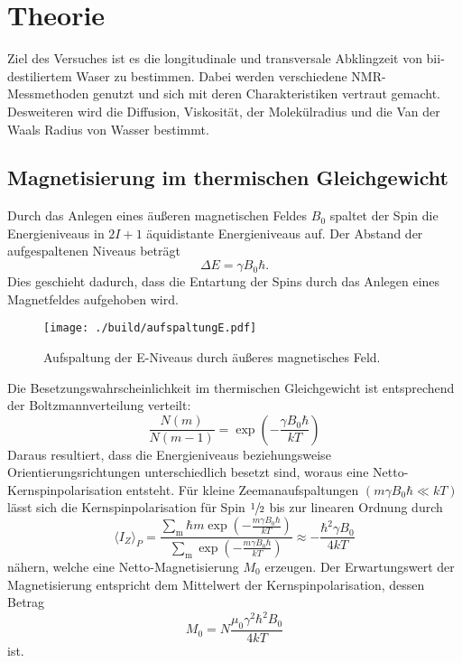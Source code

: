 \section{Theorie}%
\label{sec:theorie}
Ziel des Versuches ist es die longitudinale und transversale Abklingzeit von
bii-destiliertem Waser zu bestimmen.
Dabei werden verschiedene NMR-Messmethoden genutzt und sich mit deren
Charakteristiken vertraut gemacht.
Desweiteren wird die Diffusion, Viskosität, der Molekülradius und die Van der Waals
Radius von Wasser bestimmt.
\subsection{Magnetisierung im thermischen Gleichgewicht}%
\label{ssub:magnetieserung_im_thermischen_gleichgewicht}
Durch das Anlegen eines äußeren magnetischen Feldes $B_0$ spaltet der Spin die Energieniveaus in $2 I
+ 1$ äquidistante Energieniveaus auf.
Der Abstand der aufgespaltenen Niveaus beträgt
\begin{equation}
		\label{eq:delta_e}
		\Delta E = \gamma B_0 \hbar.
\end{equation}
Dies geschieht dadurch, dass die Entartung der Spins durch das Anlegen eines
Magnetfeldes aufgehoben wird.
\begin{figure}[ht]
		\centering
		\texttt{[image: ./build/aufspaltungE.pdf]}
		\caption{Aufspaltung der E-Niveaus durch äußeres magnetisches
		Feld. \cite{anleitung}}
		\label{fig:aufsp_E}
\end{figure}
Die Besetzungswahrscheinlichkeit im thermischen Gleichgewicht ist entsprechend
der Boltzmannverteilung verteilt:
\begin{equation}
		\label{eq:boltzmann}
		\frac{N(m)}{N(m-1)} = \exp \left( - \frac{\gamma B_0 \hbar}{kT} \right)
\end{equation}
Daraus resultiert, dass die Energieniveaus beziehungsweise Orientierungsrichtungen unterschiedlich
besetzt sind, woraus eine Netto-Kernspinpolarisation entsteht.
Für kleine Zeemanaufspaltungen $(m \gamma B_0 \hbar \ll kT)$ lässt sich die
Kernspinpolarisation für Spin $\sfrac{1}{2}$ bis zur
linearen Ordnung durch
\begin{equation}
		\label{eq:kernpo}
		\langle I_Z \rangle_P = \frac{\sum_\text{m} \hbar m \exp\left(-\frac{m \gamma B_0
		\hbar}{kT}\right)}{\sum_\text{m}\exp\left(-\frac{m \gamma B_0
		\hbar}{kT}\right)} \approx - \frac{\hbar^2 \gamma B_0}{4 kT}
\end{equation}
nähern, welche eine Netto-Magnetisierung $M_0$ erzeugen.
Der Erwartungswert der Magnetisierung entspricht dem Mittelwert der
Kernspinpolarisation, dessen Betrag
\begin{equation}
		\label{eq:magn}
		M_0 = N \frac{\mu_0 \gamma^2 \hbar^2 B_0}{4 kT}
\end{equation}
ist.

